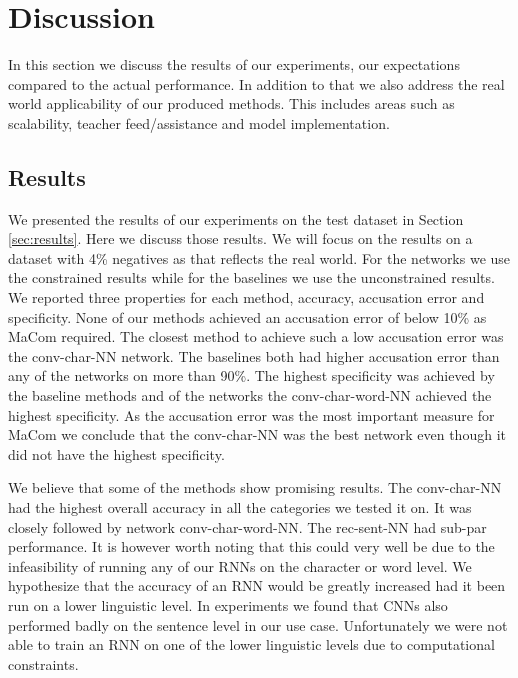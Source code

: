 \section{Discussion} \label{sec:discussion}

In this section we discuss the results of our experiments, our expectations
compared to the actual performance. In addition to that we also address the
real world applicability of our produced methods. This includes areas such as
scalability, teacher feed/assistance and model implementation.


\subsection{Results}

We presented the results of our experiments on the test dataset in Section
\ref{sec:results}. Here we discuss those results. We will focus on the results
on a dataset with 4\% negatives as that reflects the real world. For the
networks we use the constrained results while for the baselines we use the
unconstrained results. We reported three properties for each method, accuracy,
accusation error and specificity. None of our methods achieved an accusation
error of below 10\% as MaCom required. The closest method to achieve such
a low accusation error was the \gls{conv-char-NN} network. The baselines
both had higher accusation error than any of the networks on more than 90\%.
The highest specificity was achieved by the baseline methods and of the
networks the \gls{conv-char-word-NN} achieved the highest specificity. As the
accusation error was the most important measure for MaCom we conclude that the
\gls{conv-char-NN} was the best network even though it did not have the highest
specificity.

We believe that some of the methods show promising results. The
\gls{conv-char-NN} had the highest overall accuracy in all the categories we
tested it on. It was closely followed by network \gls{conv-char-word-NN}. The
\gls{rec-sent-NN} had sub-par performance. It is however worth noting that this
could very well be due to the infeasibility of running any of our \glspl{RNN} on
the character or word level. We hypothesize that the accuracy of an \gls{RNN}
would be greatly increased had it been run on a lower linguistic level. In
experiments we found that \glspl{CNN} also performed badly on the sentence level
in our use case. Unfortunately we were not able to train an \gls{RNN} on one of
the lower linguistic levels due to computational constraints.

